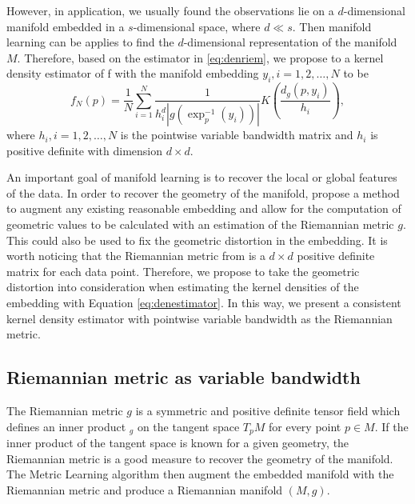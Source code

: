 \documentclass[11pt,a4paper,]{article}
\begin{document}
However, in application, we usually found the observations lie on a \(d\)-dimensional manifold embedded in a \(s\)-dimensional space, where \(d \ll s\). Then manifold learning can be applies to find the \(d\)-dimensional representation of the manifold \(M\). Therefore, based on the estimator in \eqref{eq:denriem}, we propose to a kernel density estimator of f with the manifold embedding \(y_i, i = 1, 2, \dots, N\) to be
\begin{equation}
\label{eq:denestimator}
f_N(p) = \frac{1}{N} \sum_{i=1}^{N} \frac{1}{h_i^d |g(\exp_p^{-1}(y_i))|} K(\frac{d_g(p, y_i)}{h_i}),
\end{equation}
where \(h_i, i = 1, 2, \dots, N\) is the pointwise variable bandwidth matrix and \(h_i\) is positive definite with dimension \(d\times d\).

An important goal of manifold learning is to recover the local or global features of the data. In order to recover the geometry of the manifold, \textcite{Perrault-Joncas2013-pq} propose a method to augment any existing reasonable embedding and allow for the computation of geometric values to be calculated with an estimation of the Riemannian metric \(g\). This could also be used to fix the geometric distortion in the embedding. It is worth noticing that the Riemannian metric from \textcite{Perrault-Joncas2013-pq} is a \(d\times d\) positive definite matrix for each data point. Therefore, we propose to take the geometric distortion into consideration when estimating the kernel densities of the embedding with Equation \eqref{eq:denestimator}. In this way, we present a consistent kernel density estimator with pointwise variable bandwidth as the Riemannian metric.

\hypertarget{riemannian-metric-as-variable-bandwidth}{%
\subsection{Riemannian metric as variable bandwidth}\label{riemannian-metric-as-variable-bandwidth}}

The Riemannian metric \(g\) is a symmetric and positive definite tensor field which defines an inner product \(<,>_g\) on the tangent space \(T_pM\) for every point \(p \in M\).
If the inner product of the tangent space is known for a given geometry, the Riemannian metric is a good measure to recover the geometry of the manifold.
The Metric Learning algorithm \autocite{Perrault-Joncas2013-pq} then augment the embedded manifold with the Riemannian metric and produce a Riemannian manifold \((M, g)\).
\end{document}
